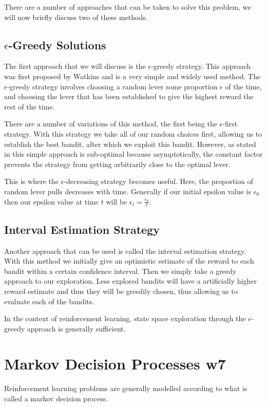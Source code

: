 There are a number of approaches that can be taken to solve this problem, we will now briefly discuss two of these
methods.

\subsection{$\epsilon$-Greedy Solutions}\label{subsec:eGreedy}
The first approach that we will discuss is the $\epsilon$-greedy strategy.
This approach was first proposed by Watkins\cite{watkins1989learning} and is a very simple and widely used method.
The $\epsilon$-greedy strategy involves choosing a random lever some proportion $\epsilon$ of the time, and
choosing the lever that has been established to give the highest reward the rest of the time.

There are a number of variations of this method, the first being the $\epsilon$-first strategy.
With this strategy we take all of our random choices first, allowing us to establish the best bandit,
after which we exploit this bandit.
However, as stated in\cite{vermorel2005multi} this simple approach is sub-optimal because asymptotically,
the constant factor prevents the strategy from getting arbitrarily close to
the optimal lever.

This is where the $\epsilon$-decreasing strategy becomes useful.
Here, the proportion of random lever pulls decreases with time.
Generally if our initial epsilon value is $\epsilon_0$ then our epsilon value at time $t$ will be
$\epsilon_t = \frac{\epsilon_0}{t}$.

\subsection{Interval Estimation Strategy}\label{subsec:ucb}
Another approach that can be used is called the interval estimation strategy.
With this method we initially give an optimistic estimate of the reward to each bandit within a certain
confidence interval.
Then we simply take a greedy approach to our exploration.
Less explored bandits will have a artificially higher reward estimate and thus they will be greedily chosen,
thus allowing us to evaluate each of the bandits.

In the context of reinforcement learning, state space exploration through the $\epsilon$-greedy approach is
generally sufficient.


\section{Markov Decision Processes w7}\label{sec:mdp}
Reinforcement learning problems are generally modelled according to what is called a markov decision process.

